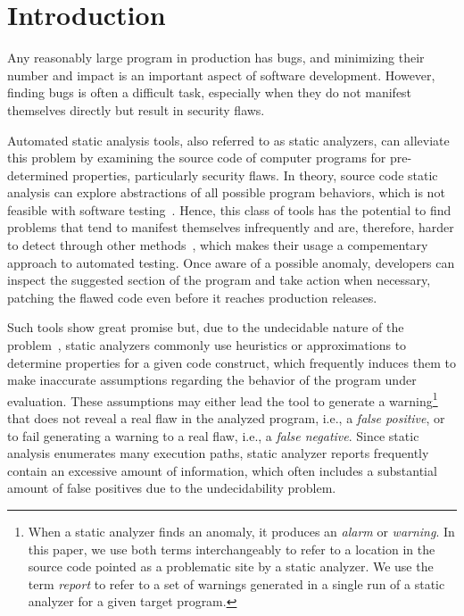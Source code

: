 \chapter{Introduction}
\label{ch:introduction}

Any reasonably large program in production has bugs,
and minimizing their number and impact is an important aspect of software
development. However, finding bugs is often a difficult task, especially when
they do not manifest themselves directly but result in security flaws.

Automated static analysis tools, also referred to as static analyzers, can
alleviate this problem by examining the source code of computer programs for
pre-determined properties, particularly security flaws. In theory, source code
static analysis can explore abstractions of all possible program behaviors,
which is not feasible with software testing~\cite{hovemeyer_finding_2004}.
Hence, this class of tools has the potential to find problems that tend to
manifest themselves infrequently and are, therefore, harder to detect through
other methods~\cite{black2009static}, which makes their usage a compementary
approach to automated testing. Once aware of a possible anomaly, developers can
inspect the suggested section of the program and take action when necessary,
patching the flawed code even before it reaches production releases.

Such tools show great promise but, due to the undecidable nature of the
problem~\cite{landi_undecidability_1992}, static analyzers commonly use
heuristics or approximations to determine properties for a given code
construct, which frequently induces them to make inaccurate assumptions
regarding the behavior of the program under evaluation. These assumptions may
either lead the tool to generate a warning\footnote{ When a static analyzer
finds an anomaly, it produces an \emph{alarm} or \emph{warning}. In this paper,
we use both terms interchangeably to refer to a location in the source code
pointed as a problematic site by a static analyzer. We use the term
\emph{report} to refer to a set of warnings generated in a single run of a
static analyzer for a given target program.  } that does not reveal a real flaw
in the analyzed program, i.e., a \emph{false positive}, or to fail generating a
warning to a real flaw, i.e., a \emph{false negative}. Since static analysis
enumerates many execution paths, static analyzer reports frequently contain an
excessive amount of information, which often includes a substantial amount of
false positives due to the undecidability problem.

